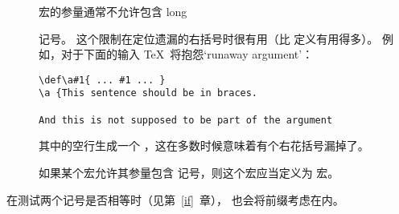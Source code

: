 \documentclass[letterpaper]{book}
\begin{document}
\begin{description}
\item []
宏的参量通常不允许包含 \cstoidx long\par{} 记号。
这个限制在定位遗漏的右括号时很有用（比  定义有用得多）。
例如，对于下面的输入 \TeX\ 将抱怨`runaway argument'：
\begin{verbatim}
\def\a#1{ ... #1 ... }
\a {This sentence should be in braces.

And this is not supposed to be part of the argument
\end{verbatim}
其中的空行生成一个 ，这在多数时候意味着有个右花括号漏掉了。

如果某个宏允许其参量包含  记号，则这个宏应当定义为  宏。
\end{description}

在测试两个记号是否相等时（见第~\ref{if}~章）， 也会将前缀考虑在内。

\begin{comment}
With a little ingenuity it is possible 
for \cs{par} tokens to sneak into macro arguments anyway.
Consider the example
\begin{verbatim}
\def\a#1\par!{ ... }
\a bc\par ef\par!
\end{verbatim}
Here the macro \cs{a} is not \cs{long}, but the argument
is \verb>bc\par ef>, which contains a \cs{par} token.
However,
this is of no importance in general.
\end{comment}
\end{document}
